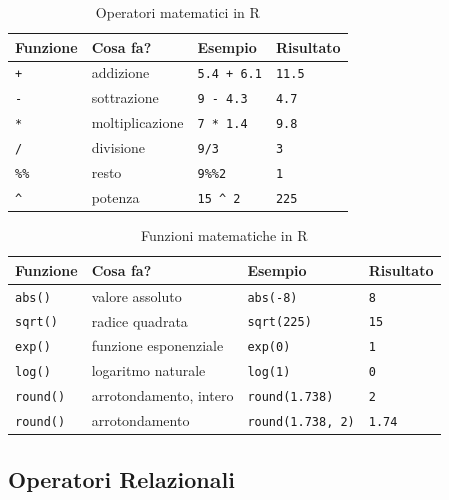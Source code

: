 \documentclass[
  a4paper,
  DIV=11,
  numbers=noendperiod]{scrreprt}
\begin{document}
\begin{table}[htbp]
\centering
\caption{Operatori matematici in R}
\label{tbl:operatori}
\begin{tabular}{llll}
\toprule
Funzione & Cosa fa? & Esempio & Risultato \\
\midrule
\texttt{+}      & addizione       & \texttt{5.4 + 6.1}    & \texttt{11.5} \\
\texttt{-}      & sottrazione     & \texttt{9 - 4.3}      & \texttt{4.7}  \\
\texttt{*}      & moltiplicazione & \texttt{7 * 1.4}      & \texttt{9.8}  \\
\texttt{/}      & divisione       & \texttt{9/3}          & \texttt{3}    \\
\texttt{\%\%}   & resto           & \texttt{9\%\%2}       & \texttt{1}    \\
\texttt{\^{}}   & potenza         & \texttt{15 \^{} 2}    & \texttt{225}  \\
\bottomrule
\end{tabular}
\end{table}

\begin{table}[htbp]
\centering
\caption{Funzioni matematiche in R}
\label{tbl:funzioni-matematiche}
\begin{tabular}{llll}
\toprule
Funzione & Cosa fa? & Esempio & Risultato \\
\midrule
\texttt{abs()}   & valore assoluto        & \texttt{abs(-8)}         & \texttt{8}    \\
\texttt{sqrt()}  & radice quadrata        & \texttt{sqrt(225)}       & \texttt{15}   \\
\texttt{exp()}   & funzione esponenziale  & \texttt{exp(0)}          & \texttt{1}    \\
\texttt{log()}   & logaritmo naturale     & \texttt{log(1)}          & \texttt{0}    \\
\texttt{round()} & arrotondamento, intero & \texttt{round(1.738)}    & \texttt{2}    \\
\texttt{round()} & arrotondamento         & \texttt{round(1.738, 2)} & \texttt{1.74} \\
\bottomrule
\end{tabular}
\end{table}

\subsection{Operatori Relazionali}\label{operatori-relazionali}
\end{document}
